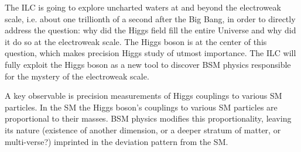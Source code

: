 The ILC is going to explore uncharted waters at and beyond the electroweak scale, i.e. about one trillionth of a second after the Big Bang, in order to directly address the question: why did the Higgs field fill the entire Universe and why did it do so at the electroweak scale. 
The Higgs boson is at the center of this question, which makes precision Higgs study of utmost importance. The ILC will fully exploit the Higgs boson as a new tool to discover BSM physics responsible for the mystery of the electroweak scale.

A key observable is precision measurements of Higgs couplings to various SM particles. In the SM the Higgs boson's couplings to various SM particles are proportional to their masses. BSM physics modifies this proportionality, leaving its nature (existence of another dimension, or a deeper stratum of matter, or multi-verse?) imprinted in the deviation pattern from the SM. 
%
%

